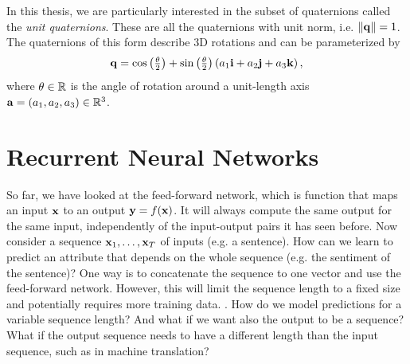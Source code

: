 		In this thesis, we are particularly interested in the subset of quaternions called the \emph{unit quaternions}. These are all the quaternions with unit norm, i.e. $\lVert \mathbf{q} \rVert = 1$. 
		The quaternions of this form describe 3D rotations and can be parameterized by
		\begin{equation}
			\mathbf{q} = 
			\cos\left(\tfrac{\theta}{2}\right) + 
			\sin\left(\tfrac{\theta}{2}\right) \left(a_1 \mathbf{i} + a_2 \mathbf{j} + a_3 \mathbf{k}\right),
		\end{equation}
		where $\theta \in \mathbb{R}$ is the angle of rotation around a unit-length axis $\mathbf{a} = (a_1, a_2, a_3) \in \mathbb{R}^3$.
	
	
	\section{Recurrent Neural Networks}
		\newcommand{\imagecourtesycolah}{Image courtesy Christopher Olah \mbox{\href{http://colah.github.io/}{(colah.github.io)}}}
		So far, we have looked at the feed-forward network, which is function that maps an input $\mathbf{x}$ to an output $\mathbf{y} = f(\mathbf{x})$.
		It will always compute the same output for the same input, independently of the input-output pairs it has seen before.
		Now consider a sequence $\mathbf{x}_1, \dots, \mathbf{x}_T$ of inputs (e.g. a sentence).
		How can we learn to predict an attribute that depends on the whole sequence (e.g. the sentiment of the sentence)?
		One way is to concatenate the sequence to one vector and use the feed-forward network.
		However, this will limit the sequence length to a fixed size and potentially requires more training data.
		.
		How do we model predictions for a variable sequence length?
		And what if we want also the output to be a sequence? 
		What if the output sequence needs to have a different length than the input sequence, such as in machine translation? 
		
